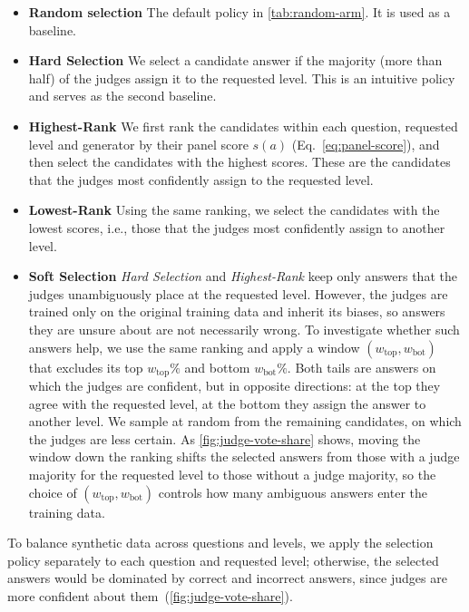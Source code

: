 \begin{itemize}
    \item \textbf{Random selection} The default policy in \autoref{tab:random-arm}. It is used as a baseline.
    \item \textbf{Hard Selection} We select a candidate answer if the majority (more than half) of the judges assign it to the requested level. This is an intuitive policy and serves as the second baseline.
    \item \textbf{Highest-Rank} We first rank the candidates within each question, requested level and generator by their panel score $s(a)$ (Eq.~\eqref{eq:panel-score}), and then select the candidates with the highest scores. These are the candidates that the judges most confidently assign to the requested level.
    \item \textbf{Lowest-Rank} Using the same ranking, we select the candidates with the lowest scores, i.e., those that the judges most confidently assign to another level.
    \item \textbf{Soft Selection} \textit{Hard Selection} and \textit{Highest-Rank} keep only answers that the judges unambiguously place at the requested level. However, the judges are trained only on the original training data and inherit its biases, so answers they are unsure about are not necessarily wrong. To investigate whether such answers help, we use the same ranking and apply a window $(w_{\mathrm{top}}, w_{\mathrm{bot}})$ that excludes its top $w_{\mathrm{top}}\%$ and bottom $w_{\mathrm{bot}}\%$. Both tails are answers on which the judges are confident, but in opposite directions: at the top they agree with the requested level, at the bottom they assign the answer to another level. We sample at random from the remaining candidates, on which the judges are less certain. As \autoref{fig:judge-vote-share} shows, moving the window down the ranking shifts the selected answers from those with a judge majority for the requested level to those without a judge majority, so the choice of $(w_{\mathrm{top}}, w_{\mathrm{bot}})$ controls how many ambiguous answers enter the training data.
\end{itemize}


To balance synthetic data across questions and levels, we apply the selection policy separately to each question and requested level; otherwise, the selected answers would be dominated by correct and incorrect answers, since judges are more confident about them~(\autoref{fig:judge-vote-share}). 

